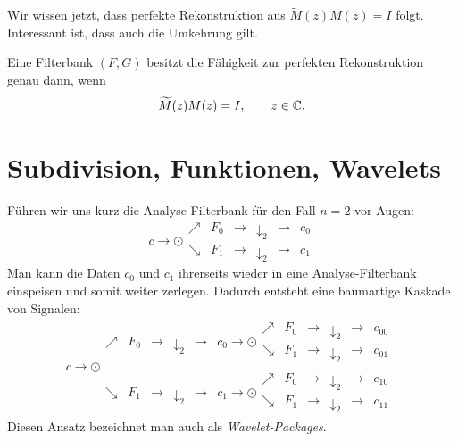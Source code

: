 Wir wissen jetzt, dass perfekte Rekonstruktion aus $ \widetilde{M}(z) M(z) = I $ folgt. Interessant
ist, dass auch die Umkehrung gilt.

\begin{proposition}
Eine Filterbank $ (F,G) $ besitzt die Fähigkeit zur perfekten Rekonstruktion genau dann, wenn
\[
  \widetilde{M}(z) M(z) = I, \qquad z \in \mathbb{C}.
\]
\end{proposition}

\section{Subdivision, Funktionen, Wavelets}

Führen wir uns kurz die Analyse-Filterbank für den Fall $ n = 2 $ vor Augen:
\[
  c \rightarrow \odot
  \begin{array}{*{6}{c}}
    \nearrow & \boxed{F_{0}} & \rightarrow & \boxed{\downarrow_{2}} & \rightarrow & c_{0} \\[1em]
    \searrow & \boxed{F_{1}} & \rightarrow & \boxed{\downarrow_{2}} & \rightarrow & c_{1}
  \end{array}
\]
Man kann die Daten $ c_{0} $ und $ c_{1} $ ihrerseits wieder in eine Analyse-Filterbank einspeisen
und somit weiter zerlegen. Dadurch entsteht eine baumartige Kaskade von Signalen:
\[
  c \rightarrow \odot
  \begin{array}{*{7}{c}}
    \nearrow & \boxed{F_{0}} & \rightarrow & \boxed{\downarrow_{2}} & \rightarrow & 
      c_{0} \rightarrow \odot
      \begin{array}{*{6}{c}}
        \nearrow & \boxed{F_{0}} & \rightarrow & \boxed{\downarrow_{2}} & \rightarrow & c_{00}
          \\[0.5em]
        \searrow & \boxed{F_{1}} & \rightarrow & \boxed{\downarrow_{2}} & \rightarrow & c_{01}
      \end{array} \\[1.5em]
    \searrow & \boxed{F_{1}} & \rightarrow & \boxed{\downarrow_{2}} & \rightarrow &
    c_{1} \rightarrow \odot
      \begin{array}{*{6}{c}}
        \nearrow & \boxed{F_{0}} & \rightarrow & \boxed{\downarrow_{2}} & \rightarrow & c_{10}
          \\[0.5em]
        \searrow & \boxed{F_{1}} & \rightarrow & \boxed{\downarrow_{2}} & \rightarrow & c_{11}
      \end{array}
  \end{array}
\]
Diesen Ansatz bezeichnet man auch als \emph{Wavelet-Packages}.

